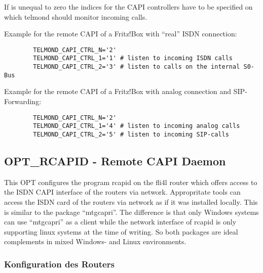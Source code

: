 \begin{description}

  If  is unequal to zero the indices for the CAPI 
  controllers have to be specified on which telmond should monitor incoming calls.

  Example for the remote CAPI of a Fritz!Box with ``real'' ISDN connection:

\begin{example}
\begin{verbatim}
        TELMOND_CAPI_CTRL_N='2'
        TELMOND_CAPI_CTRL_1='1' # listen to incoming ISDN calls
        TELMOND_CAPI_CTRL_2='3' # listen to calls on the internal S0-Bus
\end{verbatim}
\end{example}

  Example for the remote CAPI of a Fritz!Box with analog connection and
  SIP-Forwarding:

\begin{example}
\begin{verbatim}
        TELMOND_CAPI_CTRL_N='2'
        TELMOND_CAPI_CTRL_1='4' # listen to incoming analog calls
        TELMOND_CAPI_CTRL_2='5' # listen to incoming SIP-calls
\end{verbatim}
\end{example}

\end{description}

\subsection{OPT\_RCAPID - Remote CAPI Daemon}

This OPT configures the program rcapid on the fli4l router which offers access 
to the ISDN CAPI interface of the routers via network. Appropritate tools can 
access the ISDN card of the routers via network as if it was installed locally. 
This is similar to the package ``mtgcapri''. The difference is that only Windows 
systems can use ``mtgcapri'' as a client while the network interface of rcapid 
is only supporting linux systems at the time of writing. So both packages are 
ideal complements in mixed Windows- and Linux environments.

\subsubsection{Konfiguration des Routers}

